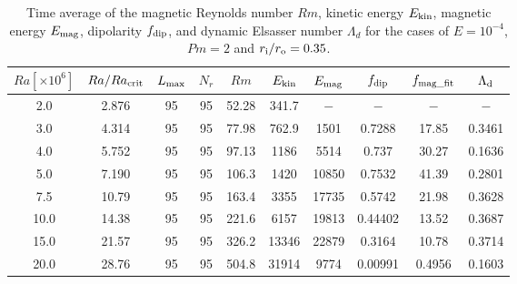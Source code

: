 \begin{table*}
{\color{red}
\caption{Time average of the magnetic Reynolds number $Rm$, kinetic energy $E_{\rm kin}$, magnetic energy $E_{\rm mag}$, dipolarity $f_{\rm dip}$, and dynamic Elsasser number $\Lambda_{d}$ for the cases of $E = 10^{-4}$, $Pm = 2$ and $r_{\rm i}/r_{\rm o} = 0.35$.}
}
{\color{red}
  \begin{tabular}{cccccccccc}
    \hline
     $Ra[\times 10^6]$  &  $Ra/Ra_{\rm crit}$& 
     $L_{\rm max}$ & $N_{r}$ & $Rm$ 
     & $E_{\rm kin}$  &  $E_{\rm mag}$ & $f_{\rm dip}$ & $f_{\rm mag\_fit}$ & $\Lambda_{\rm d}$\\
    \hline
      2.0 & 2.876 & 95 & 95 & 52.28 & 341.7 & $-$ & $-$ & $-$ & $-$  \\
      3.0 & 4.314 & 95 & 95 & 77.98 & 762.9 & 1501 & 0.7288 & 17.85 & 0.3461 \\
      4.0 & 5.752 & 95 & 95 & 97.13 & 1186 & 5514 & 0.737 & 30.27 & 0.1636 \\
      5.0 & 7.190 & 95 & 95 & 106.3 & 1420 & 10850 & 0.7532 & 41.39 & 0.2801 \\
      7.5 & 10.79 & 95 & 95 & 163.4 & 3355 & 17735 & 0.5742 & 21.98 &  0.3628 \\
      10.0 & 14.38 & 95 & 95 & 221.6 & 6157 & 19813 & 0.44402 & 13.52 &  0.3687 \\
      15.0 & 21.57 & 95 & 95 & 326.2 & 13346 & 22879 & 0.3164 & 10.78 &  0.3714  \\
      20.0 & 28.76 & 95 & 95 & 504.8 & 31914 & 9774 & 0.00991 & 0.4956 & 0.1603 \\
    \hline
  \end{tabular}
 }
\label{table:SummaryEk4_35}
\end{table*}